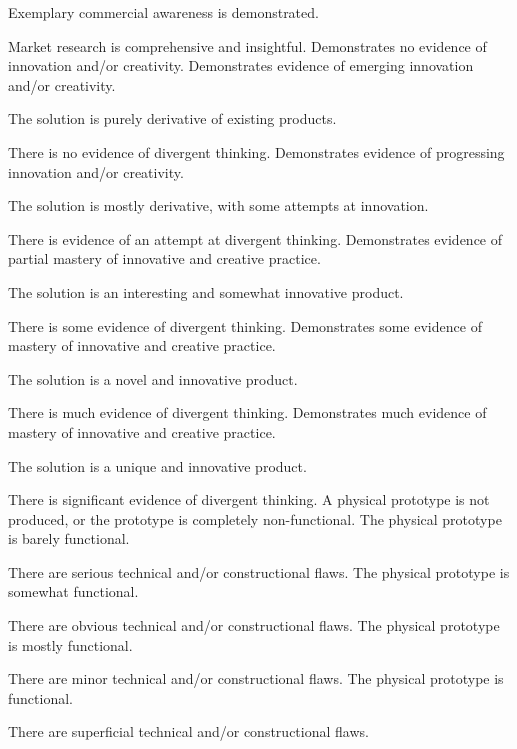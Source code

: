 \documentclass{../fal_assignment}
\begin{document}
\begin{markingrubric}
        \grade Exemplary commercial awareness is demonstrated.
            \par Market research is comprehensive and insightful.
        \grade\fail Demonstrates no evidence of innovation and/or creativity.
        \grade Demonstrates evidence of emerging innovation and/or creativity.
            \par The solution is purely derivative of existing products.
            \par There is no evidence of divergent thinking.
        \grade Demonstrates evidence of progressing innovation and/or creativity.
            \par The solution is mostly derivative, with some attempts at innovation.
            \par There is evidence of an attempt at divergent thinking.
        \grade Demonstrates evidence of partial mastery of innovative and creative practice.
            \par The solution is an interesting and somewhat innovative product.
            \par There is some evidence of divergent thinking.
        \grade Demonstrates some evidence of mastery of innovative and creative practice.
            \par The solution is a novel and innovative product.
            \par There is much evidence of divergent thinking.
        \grade Demonstrates much evidence of mastery of innovative and creative practice.
            \par The solution is a unique and innovative product.
            \par There is significant evidence of divergent thinking.
        \grade\fail A physical prototype is not produced, or the prototype is completely non-functional.
        \grade The physical prototype is barely functional.
            \par There are serious technical and/or constructional flaws.
        \grade The physical prototype is somewhat functional.
            \par There are obvious technical and/or constructional flaws.
        \grade The physical prototype is mostly functional.
            \par There are minor technical and/or constructional flaws.
        \grade The physical prototype is functional.
            \par There are superficial technical and/or constructional flaws.

\end{markingrubric}
\end{document}

